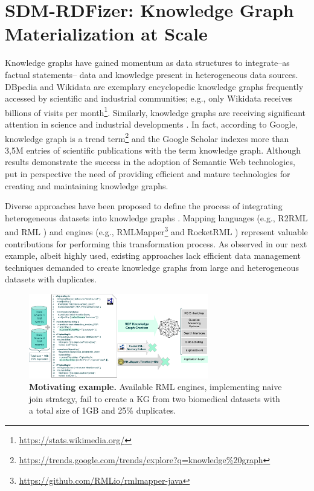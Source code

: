 \section{SDM-RDFizer: Knowledge Graph Materialization at Scale}
Knowledge graphs have gained momentum as data structures to integrate--as factual statements-- data and knowledge present in heterogeneous data sources. 
DBpedia and Wikidata are exemplary encyclopedic knowledge graphs frequently accessed by scientific and industrial communities; e.g., only Wikidata receives billions of visits per month\footnote{\url{https://stats.wikimedia.org/}}. 
Similarly, knowledge graphs are receiving significant attention in science and industrial developments \citep{AuerKPKSV18,NoyGJNPT19}. In fact, according to Google, knowledge graph is a trend term\footnote{\url{https://trends.google.com/trends/explore?q=knowledge\%20graph}} and the Google Scholar indexes more than 3,5M entries of scientific publications with the term knowledge graph.
Although results demonstrate the success in the adoption of Semantic Web technologies, put in perspective the need of providing efficient and mature technologies for creating and maintaining knowledge graphs. 

Diverse approaches have been proposed to define the process of integrating heterogeneous datasets into knowledge graphs \citep{chebotko2009semantics,calvanese2017ontop,Chaves-FragaEIC19,PriyatnaCS14}. Mapping languages (e.g., R2RML \citep{das2012r2rml} and RML \citep{DimouSCVMW14}) and engines (e.g., RMLMapper\footnote{\url{https://github.com/RMLio/rmlmapper-java}} and RocketRML \citep{csimcsek2019rocketrml}) represent valuable contributions for performing this transformation process. As observed in our next example, albeit highly used, existing approaches lack efficient data management techniques demanded to create knowledge graphs from large and heterogeneous datasets with duplicates.   
\begin{figure}[t!]
\centering
\includegraphics[width=0.7\textwidth]{figures/Motivating_Example_v1.1.pdf}
\caption{\textbf{Motivating example.} Available RML engines, implementing naive join strategy, fail to create a KG from two biomedical datasets with a total size of 1GB and 25\% duplicates.} 
\label{fig:motivatingExample}
\end{figure}


